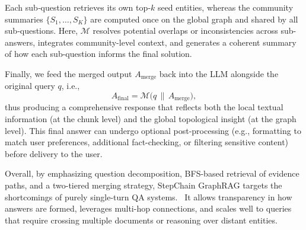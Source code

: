 \documentclass[runningheads]{llncs}
\begin{document}
Each sub‑question retrieves its own top‑$k$ seed entities, whereas the community
summaries $\{S_1,\ldots,S_K\}$ are computed once on the global graph and
shared by all sub‑questions.
Here, $\mathcal{M}$ resolves potential overlaps or inconsistencies across sub-answers, integrates 
community-level context, and generates a coherent summary of how each sub-question informs the final solution. 

Finally, we feed the merged output $A_{\mathrm{merge}}$ back into the LLM alongside the original query 
$q$, i.e.,
\begin{equation}
\label{eq:final_answer}
A_{\mathrm{final}} = \mathcal{M}\bigl(q \,\|\, A_{\mathrm{merge}}\bigr),
\end{equation}
thus producing a comprehensive response that reflects both the local textual information (at the chunk 
level) and the global topological insight (at the graph level). This final answer can undergo optional 
post-processing (e.g., formatting to match user preferences, additional fact-checking, or 
filtering sensitive content) before delivery to the user.

Overall, by emphasizing question decomposition, BFS-based retrieval of evidence paths, and a 
two-tiered merging strategy, StepChain GraphRAG targets the shortcomings of 
purely single-turn QA systems.~\cite{wei2022chain,lewis2020retrieval}
It allows transparency in how answers are formed, leverages multi-hop connections, and scales 
well to queries that require crossing multiple documents or reasoning over distant entities.
\end{document}
